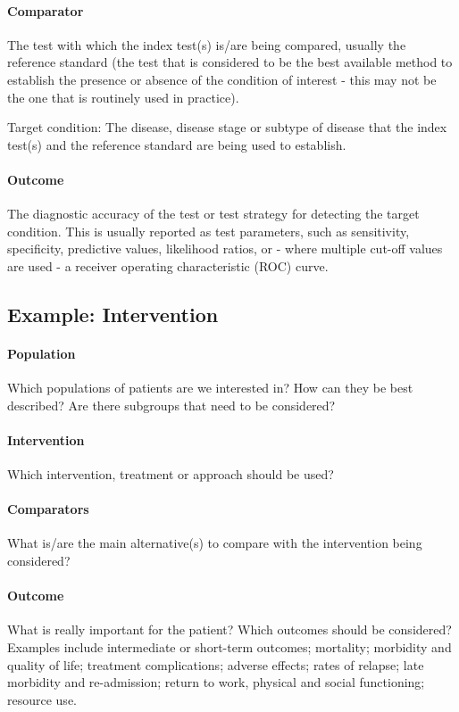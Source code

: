 \documentclass[a4paper]{article}
\begin{document}
\paragraph{Comparator} The test with which the index test(s) is/are being compared, usually the reference standard (the test that is considered to be the best available method to establish the presence or absence of the condition of interest - this may not be the one that is routinely used in practice).

Target condition: The disease, disease stage or subtype of disease that the index test(s) and the reference standard are being used to establish.

\paragraph{Outcome} The diagnostic accuracy of the test or test strategy for detecting the target condition. This is usually reported as test parameters, such as sensitivity, specificity, predictive values, likelihood ratios, or - where multiple cut-off values are used - a receiver operating characteristic (ROC) curve.

\subsection*{Example: Intervention}

\paragraph{Population} Which populations of patients are we interested in? How can they be best described? Are there subgroups that need to be considered?

\paragraph{Intervention} Which intervention, treatment or approach should be used?

\paragraph{Comparators} What is/are the main alternative(s) to compare with the intervention being considered?

\paragraph{Outcome} What is really important for the patient? Which outcomes should be considered? Examples include intermediate or short-term outcomes; mortality; morbidity and quality of life; treatment complications; adverse effects; rates of relapse; late morbidity and re-admission; return to work, physical and social functioning; resource use.
\end{document}

